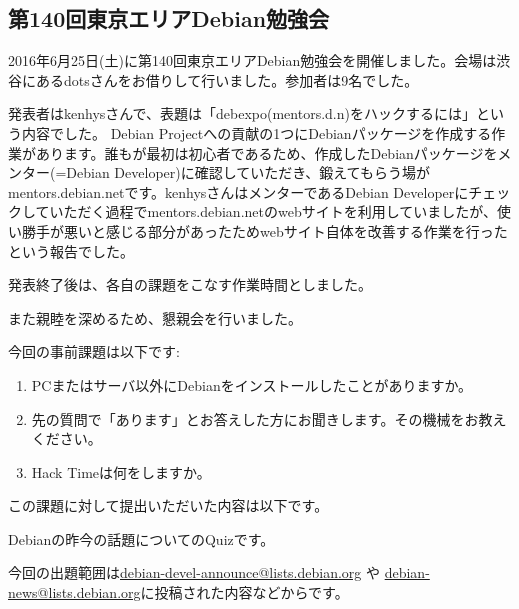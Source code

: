 \documentclass[mingoth,a4paper]{jsarticle}
\begin{document}

\subsection{第140回東京エリアDebian勉強会}

2016年6月25日(土)に第140回東京エリアDebian勉強会を開催しました。会場は渋谷にあるdotsさんをお借りして行いました。参加者は9名でした。

発表者はkenhysさんで、表題は「debexpo(mentors.d.n)をハックするには」という内容でした。
Debian Projectへの貢献の1つにDebianパッケージを作成する作業があります。誰もが最初は初心者であるため、作成したDebianパッケージをメンター(=Debian Developer)に確認していただき、鍛えてもらう場がmentors.debian.netです。kenhysさんはメンターであるDebian Developerにチェックしていただく過程でmentors.debian.netのwebサイトを利用していましたが、使い勝手が悪いと感じる部分があったためwebサイト自体を改善する作業を行ったという報告でした。

発表終了後は、各自の課題をこなす作業時間としました。

また親睦を深めるため、懇親会を行いました。



今回の事前課題は以下です:
\begin{enumerate}
\item PCまたはサーバ以外にDebianをインストールしたことがありますか。
\item 先の質問で「あります」とお答えした方にお聞きします。その機械をお教えください。
\item Hack Timeは何をしますか。
\end{enumerate}
この課題に対して提出いただいた内容は以下です。
\begin{multicols}{2}
{\small

}
\end{multicols}


Debianの昨今の話題についてのQuizです。

今回の出題範囲は\url{debian-devel-announce@lists.debian.org} や \url{debian-news@lists.debian.org}に投稿された内容などからです。

\begin{multicols}{2}

\end{multicols}


\end{document}
